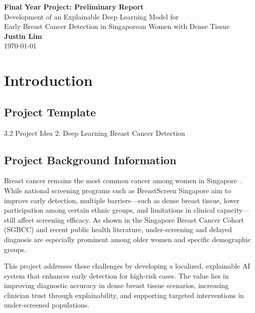 \documentclass[12pt]{article}
\begin{document}
\begin{titlepage}
    \centering
    \vspace*{\fill}

    {\LARGE \textbf{Final Year Project: Preliminary Report}}\\[2em]
    {\large Development of an Explainable Deep Learning Model for}\\[0.5em]
    {\large Early Breast Cancer Detection in Singaporean Women with Dense Tissue}\\[4em]

    {\large \textbf{Justin Lim}}\\[1em]
    {\large \today}

    \vspace*{\fill}
\end{titlepage}
\newpage
\tableofcontents
\newpage

\newpage
\section{Introduction}

\subsection{Project Template}
3.2 Project Idea 2: Deep Learning Breast Cancer Detection 

\subsection{Project Background Information}
Breast cancer remains the most common cancer among women in Singapore~\cite{10}. While national screening programs such as BreastScreen Singapore aim to improve early detection, multiple barriers—such as dense breast tissue, lower participation among certain ethnic groups, and limitations in clinical capacity—still affect screening efficacy. As shown in the Singapore Breast Cancer Cohort (SGBCC) and recent public health literature, under-screening and delayed diagnosis are especially prominent among older women and specific demographic groups. 

This project addresses these challenges by developing a localized, explainable AI system that enhances early detection for high-risk cases. The value lies in improving diagnostic accuracy in dense breast tissue scenarios, increasing clinician trust through explainability, and supporting targeted interventions in under-screened populations.
\end{document}
